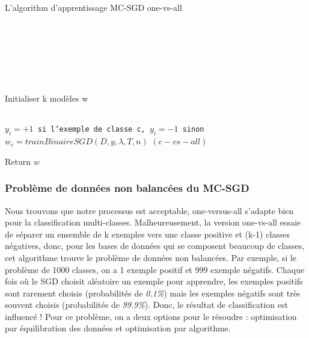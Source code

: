 \begin{algorithm}[H]
\caption{L'algorithm d'apprentissage MC-SGD one-vs-all}\label{mcsgdal}
\begin{algorithmic}[1]

\\
\\
\\
\\
\\
\\

\State Initialiser k modèles w

\\
\State \texttt{$y_i = +1$ si l'exemple de classe c, $y_i = -1$ sinon}
\State \texttt{$w_c = trainBinaireSGD(D, y, \lambda, T, n)$} $(c-vs-all)$
\EndFor

\State Return $w$

\EndProcedure
\end{algorithmic}
\end{algorithm}

\subsubsection{Problème de données non balancées du MC-SGD}
Nous trouvons que notre processus est acceptable, one-versus-all s'adapte bien pour la classification multi-classes. Malheureusement, la version one-vs-all essaie de séparer un ensemble de k exemples vers une classe positive et (k-1) classes négatives, donc, pour les bases de données qui se composent beaucoup de classes, cet algorithme trouve le problème de données non balancées. Par exemple, si le problème de 1000 classes, on a 1 exemple positif et 999 exemple négatifs. Chaque fois où le SGD choisit aléatoire un exemple pour apprendre, les exemples positifs sont rarement choisis (probabilités de \emph{0.1\%}) mais les exemples négatifs sont très souvent choisis (probabilités de \emph{99.9\%}). Donc, le résultat de classification est influencé ! Pour ce problème, on a deux options pour le résoudre : optimisation par équilibration des données et optimisation par algorithme.\\

